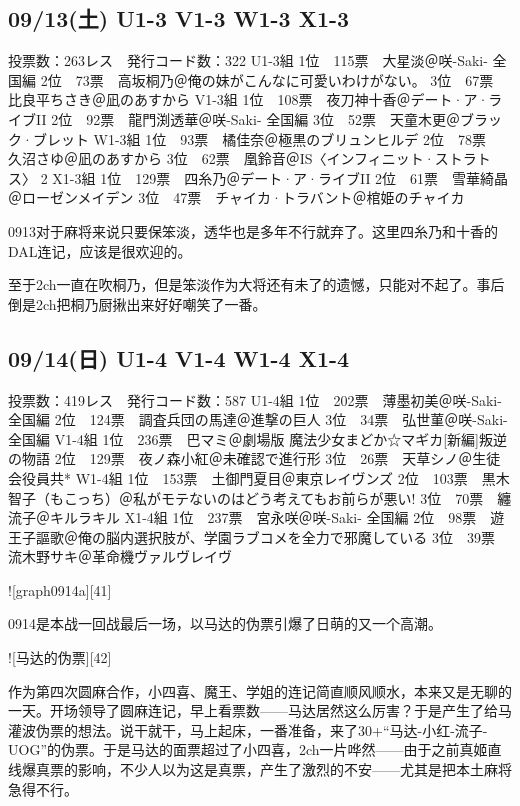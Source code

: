 \subsection{09/13(土) U1-3 V1-3 W1-3 X1-3}

    投票数：263レス　発行コード数：322
    U1-3組
    1位　115票　大星淡＠咲-Saki- 全国編
    2位　73票　高坂桐乃＠俺の妹がこんなに可愛いわけがない。
    3位　67票　比良平ちさき＠凪のあすから
    V1-3組
    1位　108票　夜刀神十香＠デート·ア·ライブII
    2位　92票　龍門渕透華＠咲-Saki- 全国編
    3位　52票　天童木更＠ブラック·ブレット
    W1-3組
    1位　93票　橘佳奈＠極黒のブリュンヒルデ
    2位　78票　久沼さゆ＠凪のあすから
    3位　62票　凰鈴音＠IS〈インフィニット·ストラトス〉 2
    X1-3組
    1位　129票　四糸乃＠デート·ア·ライブII
    2位　61票　雪華綺晶＠ローゼンメイデン
    3位　47票　チャイカ·トラバント＠棺姫のチャイカ

0913对于麻将来说只要保笨淡，透华也是多年不行就弃了。这里四糸乃和十香的DAL连记，应该是很欢迎的。

至于2ch一直在吹桐乃，但是笨淡作为大将还有未了的遗憾，只能对不起了。事后倒是2ch把桐乃厨揪出来好好嘲笑了一番。

\subsection{09/14(日) U1-4 V1-4 W1-4 X1-4}

    投票数：419レス　発行コード数：587
    U1-4組
    1位　202票　薄墨初美＠咲-Saki- 全国編
    2位　124票　調査兵団の馬達＠進撃の巨人
    3位　34票　弘世菫＠咲-Saki- 全国編
    V1-4組
    1位　236票　巴マミ＠劇場版 魔法少女まどか☆マギカ[新編]叛逆の物語
    2位　129票　夜ノ森小紅＠未確認で進行形
    3位　26票　天草シノ＠生徒会役員共*
    W1-4組
    1位　153票　土御門夏目＠東京レイヴンズ
    2位　103票　黒木智子（もこっち）＠私がモテないのはどう考えてもお前らが悪い!
    3位　70票　纏流子＠キルラキル
    X1-4組
    1位　237票　宮永咲＠咲-Saki- 全国編
    2位　98票　遊王子謳歌＠俺の脳内選択肢が、学園ラブコメを全力で邪魔している
    3位　39票　流木野サキ＠革命機ヴァルヴレイヴ

![graph0914a][41]

0914是本战一回战最后一场，以马达的伪票引爆了日萌的又一个高潮。

![马达的伪票][42]

作为第四次圆麻合作，小四喜、魔王、学姐的连记简直顺风顺水，本来又是无聊的一天。开场领导了圆麻连记，早上看票数——马达居然这么厉害？于是产生了给马灌波伪票的想法。说干就干，马上起床，一番准备，来了30+“马达-小红-流子-UOG”的伪票。于是马达的面票超过了小四喜，2ch一片哗然——由于之前真姬直线爆真票的影响，不少人以为这是真票，产生了激烈的不安——尤其是把本土麻将急得不行。

